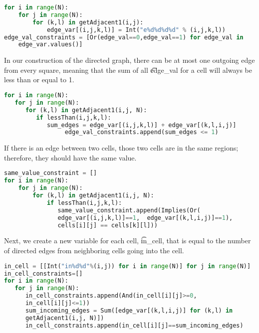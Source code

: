 \singlespace
\begin{lstlisting}[language=python, frame=single]
for i in range(N):
    for j in range(N):
        for (k,l) in getAdjacent1(i,j):
            edge_var[(i,j,k,l)] = Int("e%d%d%d%d" % (i,j,k,l))
edge_val_constraints = [Or(edge_val==0,edge_val==1) for edge_val in
    edge_var.values()]
\end{lstlisting}
\doublespace

In our construction of the directed graph, there can be at most one outgoing edge from every square, meaning that the sum of all \t{edge\_val} for a cell will always be less than or equal to 1.

\singlespace
\begin{lstlisting}[language=python, frame=single]
for i in range(N):
   for j in range(N):
      for (k,l) in getAdjacent1(i,j, N):
         if lessThan(i,j,k,l):
            sum_edges = edge_var[(i,j,k,l)] + edge_var[(k,l,i,j)]
                 edge_val_constraints.append(sum_edges <= 1)
\end{lstlisting}
\doublespace

If there is an edge between two cells, those two cells are in the same regions; therefore, they should have the same value.

\singlespace
\begin{lstlisting}[language=python, frame=single]
same_value_constraint = []
for i in range(N):
    for j in range(N):
        for (k,l) in getAdjacent1(i,j, N):
            if lessThan(i,j,k,l):
               same_value_constraint.append(Implies(Or(
               edge_var[(i,j,k,l)]==1,  edge_var[(k,l,i,j)]==1), 
               cells[i][j] == cells[k][l]))
\end{lstlisting}
\doublespace

Next, we create a new variable for each cell, \t{in\_cell}, that is equal to
the number of directed edges from neighboring cells going into the cell.

\singlespace
\begin{lstlisting}[language=python, frame=single]
in_cell = [[Int("in%d%d"%(i,j)) for i in range(N)] for j in range(N)]
in_cell_constraints=[]
for i in range(N):
   for j in range(N):
      in_cell_constraints.append(And(in_cell[i][j]>=0,
      in_cell[i][j]<=1))
      sum_incoming_edges = Sum([edge_var[(k,l,i,j)] for (k,l) in
      getAdjacent1(i,j, N)])
      in_cell_constraints.append(in_cell[i][j]==sum_incoming_edges)
\end{lstlisting}
\doublespace

